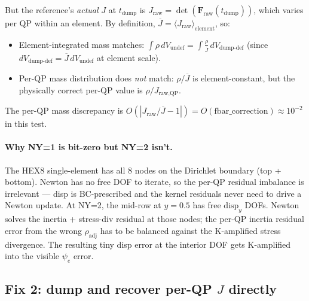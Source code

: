 \documentclass[11pt]{article}
\newcommand{\F}{\mathbf{F}}
\begin{document}
But the reference's \emph{actual} $J$ at $t_{\text{dump}}$ is $J_{\text{raw}} = \det(\F_{\text{raw}}(t_{\text{dump}}))$, which varies per QP within an element. By definition, $\overline{J} = \langle J_{\text{raw}} \rangle_{\text{element}}$, so:
\begin{itemize}
\item Element-integrated mass matches: $\int \rho \, dV_{\text{undef}} = \int \frac{\rho}{\overline{J}} \, dV_{\text{dump-def}}$ (since $dV_{\text{dump-def}} = \overline{J} \, dV_{\text{undef}}$ at element scale).
\item Per-QP mass distribution does \emph{not} match: $\rho/\overline{J}$ is element-constant, but the physically correct per-QP value is $\rho/J_{\text{raw,QP}}$.
\end{itemize}

The per-QP mass discrepancy is $O(|J_{\text{raw}}/\overline{J} - 1|) = O(\text{fbar\_correction}) \approx 10^{-2}$ in this test.

\paragraph{Why NY=1 is bit-zero but NY=2 isn't.} The HEX8 single-element has all 8 nodes on the Dirichlet boundary (top + bottom). Newton has no free DOF to iterate, so the per-QP residual imbalance is irrelevant --- disp is BC-prescribed and the kernel residuals never need to drive a Newton update. At NY=2, the mid-row at $y = 0.5$ has free $\text{disp}_y$ DOFs. Newton solves the inertia + stress-div residual at those nodes; the per-QP inertia residual error from the wrong $\rho_{\text{adj}}$ has to be balanced against the K-amplified stress divergence. The resulting tiny disp error at the interior DOF gets K-amplified into the visible $\psi_e$ error.

\subsection{Fix 2: dump and recover per-QP $J$ directly}
\end{document}
